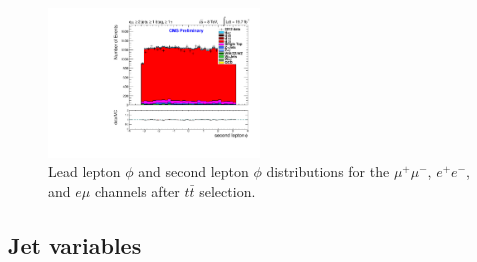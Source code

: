 \documentclass[oneside, a4paper, 11pt, ]{report}
\begin{document}
\begin{figure}
\includegraphics[width=0.5\textwidth]{Plots/ControlPlots/TTbarDiLeptonAnalysis/EMu/DiLepton/SecondLepton_Phi_splitTTbar_ratio.pdf}
\caption{Lead lepton $\phi$ and second lepton $\phi$ distributions for the $\mu^{+}\mu^{-}$, $e^{+}e^{-}$, and $e\mu$ channels after $t\bar{t}$ selection.}
\label{fig-leptonLeadPhiSecondPhi}
\end{figure}

\subsection{Jet variables}
\end{document}
